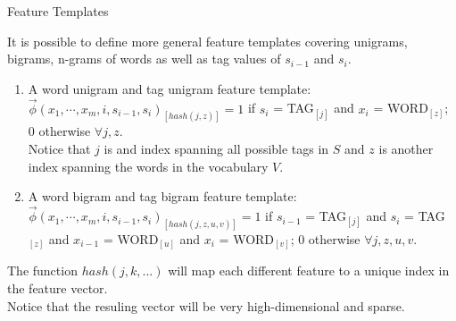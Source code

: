 \documentclass[handout]{beamer}
\begin{document}
\begin{frame}{Feature Templates}
\begin{scriptsize}

It is possible to define more general feature templates covering unigrams, bigrams, n-grams of words as well as tag values of $s_{i-1}$ and $s_i$.

\begin{enumerate}
  
 \item A word unigram and tag unigram feature template: $\vec{\phi}(x_1, \cdots, x_m, i, s_{i-1},s_i)_{[hash(j,z)]}=1$ if $s_i$ = TAG$_{[j]}$ and $x_i$ = WORD$_{[z]}$; 0 otherwise $\forall j,z$. \\ Notice that $j$ is and index spanning all possible tags in $S$ and $z$ is another index spanning the words in the vocabulary $V$.
 
 \item A word bigram and tag bigram feature template: $\vec{\phi}(x_1, \cdots, x_m, i, s_{i-1},s_i)_{[hash(j,z,u,v)]}=1$ if $s_{i-1}$ = TAG$_{[j]}$ and $s_i$ = TAG$_{[z]}$ and $x_{i-1}$ = WORD$_{[u]}$ and $x_{i}$ = WORD$_{[v]}$; 0 otherwise $\forall j,z,u,v$. 
 
 
\end{enumerate}

The function $hash(j,k,...)$ will map each different feature to a unique index in the feature vector.  \\
Notice that the resuling vector will be very high-dimensional and sparse.
\end{scriptsize}
\end{frame}
\end{document}
